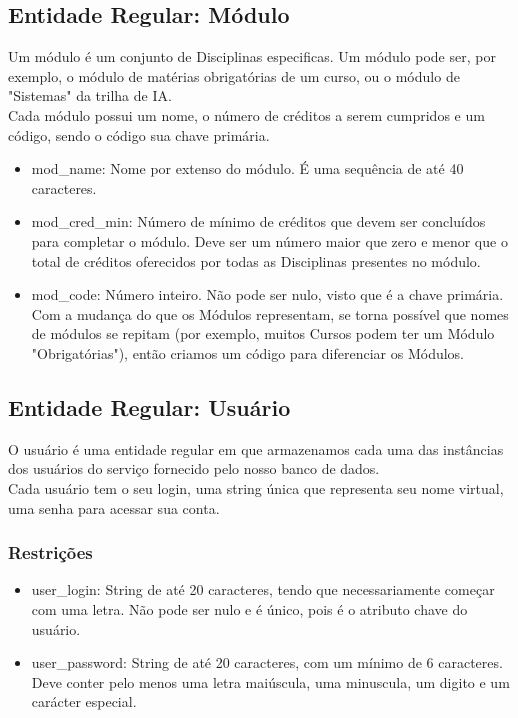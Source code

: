 \documentclass{article}
\begin{document}
    \subsection{Entidade Regular: Módulo}
        \quad Um módulo é um conjunto de Disciplinas especificas. Um módulo pode ser, por exemplo, o módulo de matérias obrigatórias de um curso, ou o módulo de "Sistemas" da trilha de IA. \\
        \quad Cada módulo possui um nome, o número de créditos a serem cumpridos e um código, sendo o código sua chave primária.
        \begin{itemize}
                \item mod\_name: Nome por extenso do módulo. É uma sequência de até 40 caracteres.
                \item mod\_cred\_min: Número de mínimo de créditos que devem ser concluídos para completar o módulo. Deve ser um número maior que zero e menor que o total de créditos oferecidos por todas as Disciplinas presentes no módulo.
                \item mod\_code: Número inteiro. Não pode ser nulo, visto que é a chave primária. Com a mudança do que os Módulos representam, se torna possível que nomes de módulos se repitam (por exemplo, muitos Cursos podem ter um Módulo "Obrigatórias"), então criamos um código para diferenciar os Módulos.
          \end{itemize}
          
    \subsection{Entidade Regular: Usuário}
        \quad O usuário é uma entidade regular em que armazenamos cada uma das instâncias dos usuários do serviço fornecido pelo nosso banco de dados. \\
        \quad Cada usuário tem o seu login, uma string única que representa seu nome virtual, uma senha para acessar sua conta.
        \subsubsection{Restrições}
            \begin{itemize}
                \item user\_login: String de até 20 caracteres, tendo que necessariamente começar com uma letra. Não pode ser nulo e é único, pois é o atributo chave do usuário.
                \item user\_password: String de até 20 caracteres, com um mínimo de 6 caracteres. Deve conter pelo menos uma letra maiúscula, uma minuscula, um digito e um carácter especial.
            \end{itemize}
            
\end{document}

